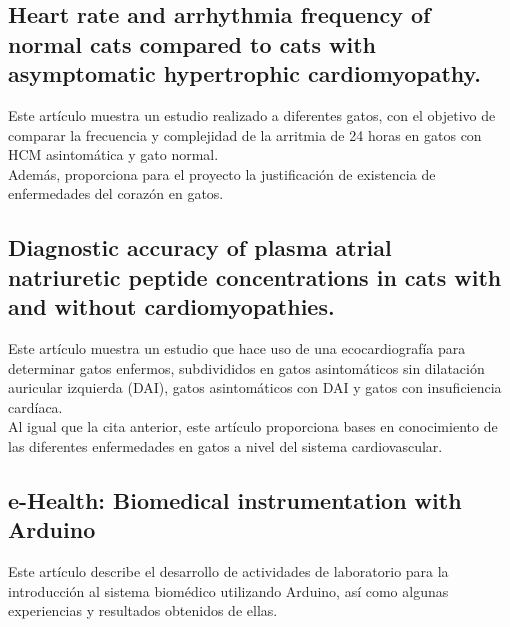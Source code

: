 \documentclass[letterpaper, 10 pt, conference]{ieeeconf}  %
\begin{document}

\subsection{Heart rate and arrhythmia frequency of normal cats compared to cats with asymptomatic hypertrophic cardiomyopathy. \cite{c2}}

Este art\'iculo muestra un estudio realizado a diferentes gatos, con el objetivo de comparar la frecuencia y complejidad de la arritmia de 24 horas en gatos con HCM asintom\'atica y gato normal.\\

Adem\'as, proporciona para el proyecto la justificaci\'on de existencia de enfermedades del coraz\'on en gatos.

\subsection{Diagnostic accuracy of plasma atrial natriuretic peptide concentrations in cats with and without cardiomyopathies. \cite{c3}}

Este art\'iculo muestra un estudio que hace uso de una ecocardiograf\'ia para determinar gatos enfermos, subdivididos en gatos asintom\'aticos sin dilataci\'on auricular izquierda (DAI), gatos asintom\'aticos con DAI y gatos con insuficiencia card\'iaca.\\ %

Al igual que la cita anterior, este art\'iculo proporciona bases en conocimiento de las diferentes enfermedades en gatos a nivel del sistema cardiovascular.

\subsection{e-Health: Biomedical instrumentation with Arduino \cite{c5}}

Este art\'iculo describe  el desarrollo de actividades de laboratorio para la introducci\'on al sistema biom\'edico utilizando Arduino, as\'i como algunas experiencias y resultados obtenidos de ellas.\\
\end{document}
